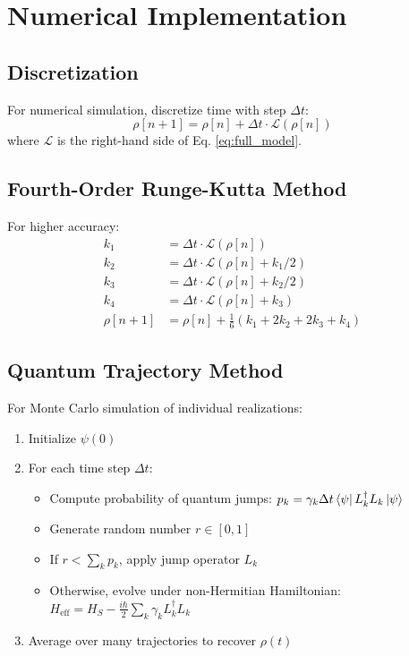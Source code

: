 \documentclass[12pt]{article}
\begin{document}
\section{Numerical Implementation}

\subsection{Discretization}
For numerical simulation, discretize time with step $\Delta t$:
\[
\rho[n+1] = \rho[n] + \Delta t \cdot \mathcal{L}(\rho[n])
\]
where $\mathcal{L}$ is the right-hand side of Eq. \eqref{eq:full_model}.

\subsection{Fourth-Order Runge-Kutta Method}
For higher accuracy:
\begin{align}
k_1 &= \Delta t \cdot \mathcal{L}(\rho[n]) \\
k_2 &= \Delta t \cdot \mathcal{L}(\rho[n] + k_1/2) \\
k_3 &= \Delta t \cdot \mathcal{L}(\rho[n] + k_2/2) \\
k_4 &= \Delta t \cdot \mathcal{L}(\rho[n] + k_3) \\
\rho[n+1] &= \rho[n] + \frac{1}{6}(k_1 + 2k_2 + 2k_3 + k_4)
\end{align}

\subsection{Quantum Trajectory Method}
For Monte Carlo simulation of individual realizations:
\begin{enumerate}
    \item Initialize $\psi(0)$
    \item For each time step $\Delta t$:
    \begin{itemize}
        \item Compute probability of quantum jumps: $p_k = \gamma_k \Delta t \bra{\psi}L_k^\dagger L_k\ket{\psi}$
        \item Generate random number $r \in [0,1]$
        \item If $r < \sum_k p_k$, apply jump operator $L_k$
        \item Otherwise, evolve under non-Hermitian Hamiltonian: $H_{\text{eff}} = H_S - \frac{i\hbar}{2}\sum_k \gamma_k L_k^\dagger L_k$
    \end{itemize}
    \item Average over many trajectories to recover $\rho(t)$
\end{enumerate}
\end{document}
